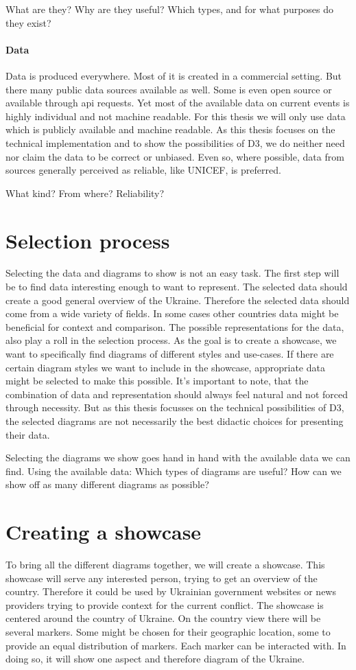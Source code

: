 \documentclass[
a4paper,     %
12pt         %
]{scrartcl}  %
\begin{document}
What are they? Why are they useful?
Which types, and for what purposes do they exist?

\paragraph{Data}
Data is produced everywhere. Most of it is created in a commercial setting. But there many public data sources available as well. Some is even open source or available through api requests. Yet most of the available data on current events is highly individual and not machine readable. For this thesis we will only use data which is publicly available and machine readable. As this thesis focuses on the technical implementation and to show the possibilities of D3, we do neither need nor claim the data to be correct or unbiased. Even so, where possible, data from sources generally perceived as reliable, like UNICEF, is preferred.

What kind? From where? Reliability?

\section{Selection process}
Selecting the data and diagrams to show is not an easy task. The first step will be to find data interesting enough to want to represent. The selected data should create a good general overview of the Ukraine. Therefore the selected data should come from a wide variety of fields. In some cases other countries data might be beneficial for context and comparison. The possible representations for the data, also play a roll in the selection process. As the goal is to create a showcase, we want to specifically find diagrams of different styles and use-cases. If there are certain diagram styles we want to include in the showcase, appropriate data might be selected to make this possible. It's important to note, that the combination of data and representation should always feel natural and not forced through necessity. But as this thesis focusses on the technical possibilities of D3, the selected diagrams are not necessarily the best didactic choices for presenting their data.

Selecting the diagrams we show goes hand in hand with the available data we can find. 
Using the available data: Which types of diagrams are useful? How can we show off as many different diagrams as possible?

\section{Creating a showcase}
To bring all the different diagrams together, we will create a showcase. This showcase will serve any interested person, trying to get an overview of the country. Therefore it could be used by Ukrainian government websites or news providers trying to provide context for the current conflict. The showcase is centered around the country of Ukraine. On the country view there will be several markers. Some might be chosen for their geographic location, some to provide an equal distribution of markers. Each marker can be interacted with. In doing so, it will show one aspect and therefore diagram of the Ukraine.
\end{document}
